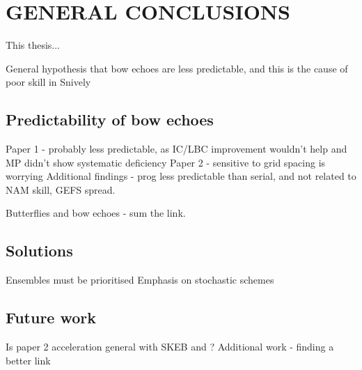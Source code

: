 \chapter{GENERAL CONCLUSIONS}

This thesis...

General hypothesis that bow echoes are less predictable, and this is the cause of poor skill in Snively

\section{Predictability of bow echoes}

Paper 1 - probably less predictable, as IC/LBC improvement wouldn't help and MP didn't show systematic deficiency
Paper 2 - sensitive to grid spacing is worrying
Additional findings - prog less predictable than serial, and not related to NAM skill, GEFS spread.

Butterflies and bow echoes - sum the link.

\section{Solutions}
Ensembles must be prioritised
Emphasis on stochastic schemes

\section{Future work}
Is paper 2 acceleration general with SKEB and \dx?
Additional work - finding a better link